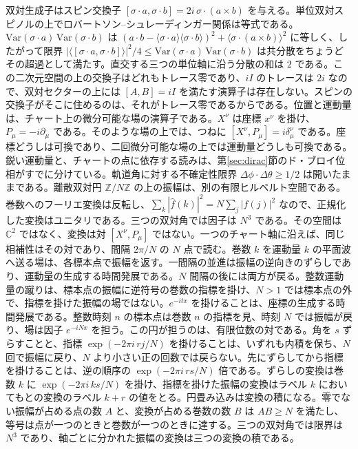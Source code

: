 \documentclass[a4paper]{article}
\begin{document}
双対生成子はスピン交換子 $[\sigma\cdot a,\sigma\cdot b]=2i\,\sigma\cdot(a\times b)$ を与える。単位双対スピノルの上でロバートソン--シュレーディンガー関係は等式である。$\mathrm{Var}(\sigma\cdot a)\,\mathrm{Var}(\sigma\cdot b)$ は $(a\cdot b-\langle\sigma\cdot a\rangle\langle\sigma\cdot b\rangle)^2+\langle\sigma\cdot(a\times b)\rangle^2$ に等しく、したがって限界 $|\langle[\sigma\cdot a,\sigma\cdot b]\rangle|^2/4\le\mathrm{Var}(\sigma\cdot a)\,\mathrm{Var}(\sigma\cdot b)$ は共分散をちょうどその超過として満たす。直交する三つの単位軸に沿う分散の和は $2$ である。この二次元空間の上の交換子はどれもトレース零であり、$iI$ のトレースは $2i$ なので、双対セクターの上には $[A,B]=iI$ を満たす演算子は存在しない。スピンの交換子がそこに住めるのは、それがトレース零であるからである。位置と運動量は、チャート上の微分可能な場の演算子である。$X^\nu$ は座標 $x^\nu$ を掛け、$P_\mu=-i\partial_\mu$ である。そのような場の上では、つねに $[X^\nu,P_\mu]=i\delta^\nu_\mu$ である。座標どうしは可換であり、二回微分可能な場の上では運動量どうしも可換である。鋭い運動量と、チャートの点に依存する読みは、第\ref{sec:dirac}節のド・ブロイ位相がすでに分けている。軌道角に対する不確定性限界 $\Delta\phi\cdot\Delta\theta\ge 1/2$ は開いたままである。離散双対円 $\mathbb{Z}/N\mathbb{Z}$ の上の振幅は、別の有限ヒルベルト空間である。巻数へのフーリエ変換は反転し、$\sum_k|\hat f(k)|^2=N\sum_j|f(j)|^2$ なので、正規化した変換はユニタリである。三つの双対角では因子は $N^3$ である。その空間は $\mathbb{C}^2$ ではなく、変換は対 $[X^\nu,P_\mu]$ ではない。一つのチャート軸に沿えば、同じ相補性はその対であり、間隔 \(2\pi/N\) の \(N\) 点で読む。巻数 \(k\) を運動量 \(k\) の平面波へ送る場は、各標本点で振幅を返す。一間隔の並進は振幅の逆向きのずらしであり、運動量の生成する時間発展である。\(N\) 間隔の後には両方が戻る。整数運動量の蹴りは、標本点の振幅に逆符号の巻数の指標を掛け、\(N>1\) では標本点の外で、指標を掛けた振幅の場ではない。\(e^{-itx}\) を掛けることは、座標の生成する時間発展である。整数時刻 \(n\) の標本点は巻数 \(n\) の指標を見、時刻 \(N\) では振幅が戻り、場は因子 \(e^{-iNx}\) を担う。この円が担うのは、有限位数の対である。角を \(s\) ずらすことと、指標 \(\exp(-2\pi i\, rj/N)\) を掛けることは、いずれも内積を保ち、\(N\) 回で振幅に戻り、\(N\) より小さい正の回数では戻らない。先にずらしてから指標を掛けることは、逆の順序の \(\exp(-2\pi i\, rs/N)\) 倍である。ずらしの変換は巻数 \(k\) に \(\exp(-2\pi i\, ks/N)\) を掛け、指標を掛けた振幅の変換はラベル \(k\) においてもとの変換のラベル \(k+r\) の値をとる。円畳み込みは変換の積になる。零でない振幅が占める点の数 \(A\) と、変換が占める巻数の数 \(B\) は \(AB\ge N\) を満たし、等号は点が一つのときと巻数が一つのときに達する。三つの双対角では限界は \(N^3\) であり、軸ごとに分かれた振幅の変換は三つの変換の積である。
\end{document}
